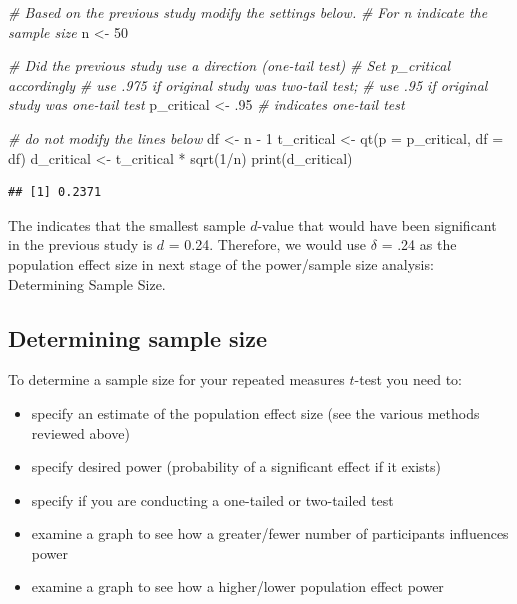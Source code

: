 \documentclass[
]{krantz}
\makeatletter
\newenvironment{Shaded}{\begin{snugshade}}{\end{snugshade}}
\newcommand{\AttributeTok}[1]{\textcolor[rgb]{0.61,0.61,0.61}{#1}}
\newcommand{\CommentTok}[1]{\textcolor[rgb]{0.37,0.37,0.37}{\textit{#1}}}
\newcommand{\DecValTok}[1]{\textcolor[rgb]{0.06,0.06,0.06}{#1}}
\newcommand{\FunctionTok}[1]{\textcolor[rgb]{0,0,0}{#1}}
\newcommand{\NormalTok}[1]{#1}
\newcommand{\OtherTok}[1]{\textcolor[rgb]{0.37,0.37,0.37}{#1}}
\newcommand{\SpecialCharTok}[1]{\textcolor[rgb]{0,0,0}{#1}}
\newenvironment{kframe}{%
\medskip{}
\setlength{\fboxsep}{.8em}
 \def\at@end@of@kframe{}%
 \ifinner\ifhmode%
  \def\at@end@of@kframe{\end{minipage}}%
  \begin{minipage}{\columnwidth}%
 \fi\fi%
 \def\FrameCommand##1{\hskip\@totalleftmargin \hskip-\fboxsep
 \colorbox{shadecolor}{##1}\hskip-\fboxsep
     \hskip-\linewidth \hskip-\@totalleftmargin \hskip\columnwidth}%
 \MakeFramed {\advance\hsize-\width
   \@totalleftmargin\z@ \linewidth\hsize
   \@setminipage}}%
 {\par\unskip\endMakeFramed%
 \at@end@of@kframe}
\renewenvironment{Shaded}{\begin{kframe}}{\end{kframe}}
\makeatother
\begin{document}
\begin{Shaded}
\begin{Highlighting}[]
\CommentTok{\# Based on the previous study modify the settings below.}
\CommentTok{\# For n indicate the sample size}
\NormalTok{n }\OtherTok{\textless{}{-}} \DecValTok{50}

\CommentTok{\# Did the previous study use a direction (one{-}tail test)}
\CommentTok{\# Set p\_critical accordingly}
\CommentTok{\# use .975 if original study was two{-}tail test;}
\CommentTok{\# use .95 if original study was one{-}tail test}
\NormalTok{p\_critical }\OtherTok{\textless{}{-}}\NormalTok{ .}\DecValTok{95} \CommentTok{\# indicates one{-}tail test}

\CommentTok{\# do not modify the lines below}
\NormalTok{df }\OtherTok{\textless{}{-}}\NormalTok{ n }\SpecialCharTok{{-}} \DecValTok{1}
\NormalTok{t\_critical }\OtherTok{\textless{}{-}} \FunctionTok{qt}\NormalTok{(}\AttributeTok{p =}\NormalTok{ p\_critical, }\AttributeTok{df =}\NormalTok{ df) }
\NormalTok{d\_critical }\OtherTok{\textless{}{-}}\NormalTok{ t\_critical }\SpecialCharTok{*} \FunctionTok{sqrt}\NormalTok{(}\DecValTok{1}\SpecialCharTok{/}\NormalTok{n)}
\FunctionTok{print}\NormalTok{(d\_critical)}
\end{Highlighting}
\end{Shaded}

\begin{verbatim}
## [1] 0.2371
\end{verbatim}

The indicates that the smallest sample \(d\)-value that would have been significant in the previous study is \(d\) = 0.24. Therefore, we would use \(\delta\) = .24 as the population effect size in next stage of the power/sample size analysis: Determining Sample Size.

\hypertarget{determining-sample-size-1}{%
\subsection{Determining sample size}\label{determining-sample-size-1}}

To determine a sample size for your repeated measures \(t\)-test you need to:

\begin{itemize}
\item
  specify an estimate of the population effect size (see the various methods reviewed above)
\item
  specify desired power (probability of a significant effect if it exists)
\item
  specify if you are conducting a one-tailed or two-tailed test
\item
  examine a graph to see how a greater/fewer number of participants influences power
\item
  examine a graph to see how a higher/lower population effect power
\end{itemize}
\end{document}
